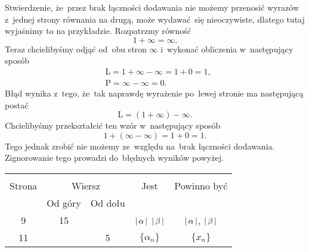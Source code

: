 \documentclass[a4paper,11pt]{article}
\begin{document}
\vspace{\spaceFour}



\start {} Stwierdzenie, że~przez brak łączności dodawania nie
możemy przenosić wyrazów z~jednej strony równania na drugą, może
wydawać~się nieoczywiste, dlatego tutaj wyjaśnimy to na przykładzie.
Rozpatrzmy równość
\begin{equation}
  \label{eq:LojasiewiczWDTFRz-06}
  1 + \infty = \infty.
\end{equation}
Teraz chcielibyśmy odjąć od~obu stron $\infty$ i~wykonać obliczenia
w~następujący sposób
\begin{equation}
  \label{eq:LojasiewiczWDTFRz-07}
  \begin{split}
    &\textrm{L} = 1 + \infty - \infty = 1 + 0 = 1, \\
    &\textrm{P} = \infty - \infty = 0.
  \end{split}
\end{equation}
Błąd wynika z~tego, że~tak naprawdę wyrażenie po~lewej stronie ma
następującą postać
\begin{equation}
  \label{eq:LojasiewiczWDTFRz-08}
  \textrm{L} = ( 1 + \infty ) - \infty.
\end{equation}
Chcielibyśmy przekształcić ten wzór w~następujący sposób
\begin{equation}
  \label{eq:LojasiewiczWDTFRz-09}
  1 + ( \infty - \infty ) = 1 + 0 = 1.
\end{equation}
Tego jednak zrobić nie możemy ze~względu na~brak łączności dodawania.
Zignorowanie tego prowadzi do~błędnych wyników powyżej.

\vspace{\spaceFour}







\begin{center}

  \begin{tabular}{|c|c|c|c|c|}
    \hline
    & \multicolumn{2}{c|}{} & & \\
    Strona & \multicolumn{2}{c|}{Wiersz} & Jest
                              & Powinno być \\ \cline{2-3}
    & Od góry & Od dołu & & \\
    \hline
    9   & 15 & & $|\, {  \alpha  } \,|$ $|\, {  \beta  } \,|$
           & $|\, {  \alpha  } \,|$, $|\, {  \beta  } \,|$ \\
    11  & &  5 & $\{ \alpha_{ n } \}$ & $\{ x_{ n } \}$ \\
    \hline
  \end{tabular}

\end{center}
\end{document}
